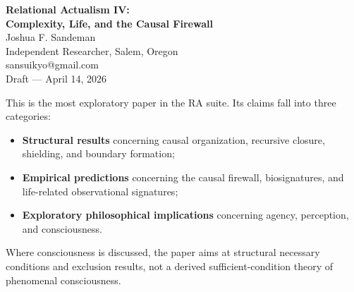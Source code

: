 \documentclass[11pt]{article}
\begin{document}
\begin{center}
{\LARGE \textbf{Relational Actualism IV:\\[0.3em] Complexity, Life, and the Causal Firewall}}\\[1em]
{\large Joshua F. Sandeman}\\[0.25em]
{\normalsize Independent Researcher, Salem, Oregon}\\[0.15em]
{\small sansuikyo@gmail.com}\\[0.5em]
{\normalsize Draft --- April 14, 2026}
\end{center}

\begin{abstract}
This paper extends Relational Actualism (RA) into complexity, life, agency, and cognition using only native categories: recursive coarse-graining, causal shielding, redundant boundary inscription, bounded boundary turnover, finite assembly depth, and recursive closure. Its strongest claims are structural rather than theorem-complete: the paper identifies organizational conditions under which stable self-maintaining complexity can persist, and separates those conditions sharply from downstream historical overlays in quantum information, thermodynamics, and continuum theory. The active support surface used in this revision is intentionally narrow: graph-cut / ledger structure from \texttt{RA\_GraphCore.lean}, kernel-locality from \texttt{RA\_O01\_KernelLocality\_v2.lean}, arithmetic core from \texttt{RA\_O14\_ArithmeticCore\_v1.lean}, and the compiled D1-native motif chain where complex organization inherits finite closure and ledger/orientation structure from Paper~II. A shielding theorem strong enough to underwrite the old Markov-blanket rhetoric is \emph{not} treated here as active support. Small-molecule computation, quantum-information ceilings, and thermodynamic comparisons are therefore either deferred native targets or external comparison material. The paper should be read as a disciplined native extension programme for life and cognition, not as closure on those domains.
\end{abstract}

\begin{tcolorbox}[title=Epistemic Status of This Paper,colback=gray!5,colframe=gray!60]
This is the most exploratory paper in the RA suite. Its claims fall into three categories:
\begin{itemize}[nosep]
    \item \textbf{Structural results} concerning causal organization, recursive closure, shielding, and boundary formation;
    \item \textbf{Empirical predictions} concerning the causal firewall, biosignatures, and life-related observational signatures;
    \item \textbf{Exploratory philosophical implications} concerning agency, perception, and consciousness.
\end{itemize}
Where consciousness is discussed, the paper aims at structural necessary conditions and exclusion results, not a derived sufficient-condition theory of phenomenal consciousness.
\end{tcolorbox}
\end{document}
